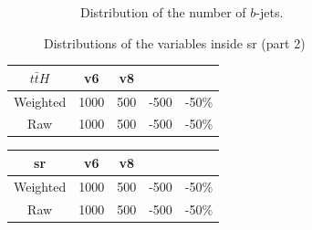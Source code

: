 \begin{figure}[htb!]
\begin{subfigure}{0.45\textwidth}
        \caption{Distribution of the number of $b$-jets.}
        \label{fig:nbjets}
    \end{subfigure}
    \caption{Distributions of the variables inside \gls{sr} (part 2)}
    \label{fig:distributions2}
\end{figure}

\begin{minipage}{0.45\textwidth}
    \centering
    \begin{tabular}{c|c|c|c|c}
        $t\bar{t}H$ & \textbf{v6} & \textbf{v8} &      &       \\
        \hline
        Weighted    & 1000        & 500         & -500 & -50\% \\
        Raw         & 1000        & 500         & -500 & -50\% \\
        \hline
    \end{tabular}
    \label{tab:ttH_event_numbers1}
\end{minipage}\hfill%
\begin{minipage}{0.45\textwidth}
    \centering
    \begin{tabular}{c|c|c|c|c}
        \gls{sr} & \textbf{v6} & \textbf{v8} &      &       \\
        \hline
        Weighted & 1000        & 500         & -500 & -50\% \\
        Raw      & 1000        & 500         & -500 & -50\% \\
        \hline
    \end{tabular}
    \label{tab:ttH_event_numbers2}
\end{minipage}
